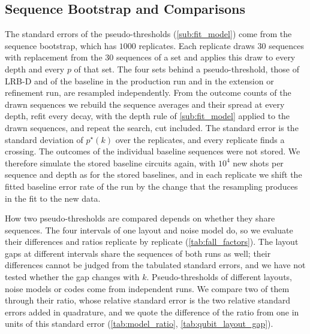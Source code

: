 \subsection{Sequence Bootstrap and Comparisons}
\label{app:campaign-bootstrap}

The standard errors of the pseudo-thresholds (\autoref{sub:fit_model}) come from the sequence bootstrap, which has $1000$ replicates. Each replicate draws 30 sequences with replacement from the 30 sequences of a set and applies this draw to every depth and every $p$ of that set. The four sets behind a pseudo-threshold, those of LRB-D and of the baseline in the production run and in the extension or refinement run, are resampled independently. From the outcome counts of the drawn sequences we rebuild the sequence averages and their spread at every depth, refit every decay, with the depth rule of \autoref{sub:fit_model} applied to the drawn sequences, and repeat the search, cut included. The standard error is the standard deviation of $p^\star(k)$ over the replicates, and every replicate finds a crossing. The outcomes of the individual baseline sequences were not stored. We therefore simulate the stored baseline circuits again, with $10^4$ new shots per sequence and depth as for the stored baselines, and in each replicate we shift the fitted baseline error rate of the run by the change that the resampling produces in the fit to the new data.

How two pseudo-thresholds are compared depends on whether they share sequences. The four intervals of one layout and noise model do, so we evaluate their differences and ratios replicate by replicate (\autoref{tab:fall_factors}). The layout gaps at different intervals share the sequences of both runs as well; their differences cannot be judged from the tabulated standard errors, and we have not tested whether the gap changes with $k$. Pseudo-thresholds of different layouts, noise models or codes come from independent runs. We compare two of them through their ratio, whose relative standard error is the two relative standard errors added in quadrature, and we quote the difference of the ratio from one in units of this standard error (\autoref{tab:model_ratio}, \autoref{tab:qubit_layout_gap}).

